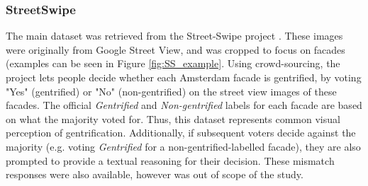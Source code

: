 \subsubsection{StreetSwipe}
The main dataset was retrieved from the Street-Swipe project \cite{streetswipe}. These images were originally from Google Street View, and was cropped to focus on facades (examples can be seen in Figure \ref{fig:SS_example}. Using crowd-sourcing, the project lets people decide whether each Amsterdam facade is gentrified, by voting "Yes" (gentrified) or "No" (non-gentrified) on the street view images of these facades. The official \textit{Gentrified} and \textit{Non-gentrified} labels for each facade are based on what the majority voted for. Thus, this dataset represents common visual perception of gentrification. Additionally, if subsequent voters decide against the majority (e.g. voting \textit{Gentrified} for a non-gentrified-labelled facade), they are also prompted to provide a textual reasoning for their decision. These mismatch responses were also available, however was out of scope of the study. 

